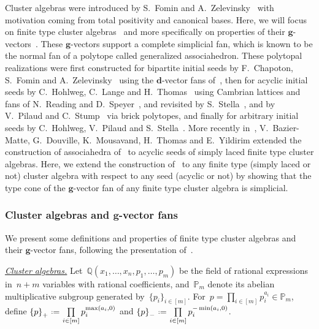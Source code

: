 \documentclass{amsart}
\theoremstyle{definition}
\newcommand{\Q}{\mathbb{Q}} %
\renewcommand{\b}[1]{{\boldsymbol{#1}}} %
\newcommand{\eqdef}{\mbox{\,\raisebox{0.2ex}{\scriptsize\ensuremath{\mathrm:}}\ensuremath{=}\,}} %
\newcommand{\para}[1]{\medskip\noindent\uline{\textit{#1.}}} %
\newcommand{\Trop}[1]{\mathbb{P}_{#1}} %
\newcommand{\positiveExponents}[1]{\left\{#1\right\}_+} %
\newcommand{\negativeExponents}[1]{\left\{#1\right\}_-} %
\begin{document}
Cluster algebras were introduced by S.~Fomin and A.~Zelevinsky~\cite{FominZelevinsky-ClusterAlgebrasI} with motivation coming from total positivity and canonical bases.
Here, we will focus on finite type cluster algebras~\cite{FominZelevinsky-ClusterAlgebrasII} and more specifically on properties of their $\b{g}$-vectors~\cite{FominZelevinsky-ClusterAlgebrasIV}.
These $\b{g}$-vectors support a complete simplicial fan, which is known to be the normal fan of a polytope called generalized associahedron. These polytopal realizations were first constructed for bipartite initial seeds by F.~Chapoton, S.~Fomin and A.~Zelevinsky~\cite{ChapotonFominZelevinsky} using the $\b{d}$-vector fans of~\cite{FominZelevinsky-YSystems}, then for acyclic initial seeds by C.~Hohlweg, C.~Lange and H.~Thomas~\cite{HohlwegLangeThomas} using Cambrian lattices and fans of N.~Reading and D.~Speyer~\cite{Reading-CambrianLattices, ReadingSpeyer}, and revisited by S.~Stella~\cite{Stella}, and by V.~Pilaud and C.~Stump~\cite{PilaudStump-brickPolytope} via brick polytopes, and finally for arbitrary initial seeds by C.~Hohlweg, V.~Pilaud and S.~Stella~\cite{HohlwegPilaudStella}.
More recently in~\cite{BazierMatteDouvilleMousavandThomasYildirim}, V.~Bazier-Matte, G.~Douville, K.~Mousavand, H.~Thomas and E.~Yildirim extended the construction of associahedra of~\cite[Sect.~3.2]{ArkaniHamedBaiHeYan} to acyclic seeds of simply laced finite type cluster algebras.
Here, we extend the construction of~\cite[Sect.~3.2]{ArkaniHamedBaiHeYan} to any finite type (simply laced or not) cluster algebra with respect to any seed (acyclic or not) by showing that the type cone of the $\b{g}$-vector fan of any finite type cluster algebra is simplicial.

\subsubsection{Cluster algebras and $\b{g}$-vector fans}

We present some definitions and properties of finite type cluster algebras and their $\b{g}$-vector fans, following the presentation of~\cite{HohlwegPilaudStella}.

\para{Cluster algebras}
%
Let~$\Q(x_1, \dots, x_n, p_1, \dots, p_m)$ be the field of rational expressions in~$n+m$ variables with rational coefficients, and~$\Trop{m}$ denote its abelian multiplicative subgroup generated by~$\{p_i\}_{i \in [m]}$.
For~$p = \prod\limits_{i \in [m]} p_i^{a_i} \in \Trop{m}$, define
\(
\positiveExponents{p} \eqdef \prod\limits_{i \in [m]} p_i^{\max(a_i,0)}
\)
and
\(
\negativeExponents{p} \eqdef \prod\limits_{i \in [m]} p_i^{-\min(a_i,0)}
\).
\end{document}
